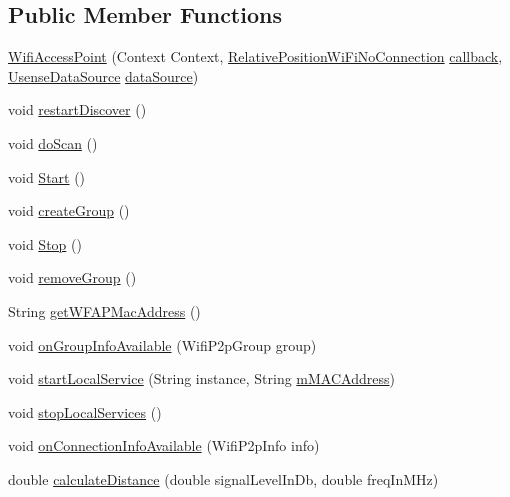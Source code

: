 \subsection*{Public Member Functions}
\begin{DoxyCompactItemize}
\item 
\hyperlink{classcs_1_1usense_1_1location_1_1_wifi_access_point_aa3fc382e38fa0c62693dddefd3700edf}{Wifi\+Access\+Point} (Context Context, \hyperlink{classcs_1_1usense_1_1location_1_1_relative_position_wi_fi_no_connection}{Relative\+Position\+Wi\+Fi\+No\+Connection} \hyperlink{classcs_1_1usense_1_1location_1_1_wifi_access_point_a82f3956b7d04dc3094a2be54f0d4fde4}{callback}, \hyperlink{classcs_1_1usense_1_1db_1_1_usense_data_source}{Usense\+Data\+Source} \hyperlink{classcs_1_1usense_1_1location_1_1_wifi_access_point_a046e96970d77ff745ff03479896c6c74}{data\+Source})
\item 
void \hyperlink{classcs_1_1usense_1_1location_1_1_wifi_access_point_a73cc968d6eee74781820ff3ac7110f05}{restart\+Discover} ()
\item 
void \hyperlink{classcs_1_1usense_1_1location_1_1_wifi_access_point_a11473f8fc644e34541c4a235222c90a6}{do\+Scan} ()
\item 
void \hyperlink{classcs_1_1usense_1_1location_1_1_wifi_access_point_a77f7aa89f57bd30bf9c8a8f5a52523bb}{Start} ()
\item 
void \hyperlink{classcs_1_1usense_1_1location_1_1_wifi_access_point_a7afd9a125fb7bf6dbc21494896134bda}{create\+Group} ()
\item 
void \hyperlink{classcs_1_1usense_1_1location_1_1_wifi_access_point_a05db8939668e0ac3e0c8a106fda31c55}{Stop} ()
\item 
void \hyperlink{classcs_1_1usense_1_1location_1_1_wifi_access_point_a78c51a45a27a22375d51105a5baf1a60}{remove\+Group} ()
\item 
String \hyperlink{classcs_1_1usense_1_1location_1_1_wifi_access_point_aa64769c3ebaf9ec1481ee2123b180d7c}{get\+W\+F\+A\+P\+Mac\+Address} ()
\item 
void \hyperlink{classcs_1_1usense_1_1location_1_1_wifi_access_point_a57e5cc1c85b2b78c7d08e18357633fa7}{on\+Group\+Info\+Available} (Wifi\+P2p\+Group group)
\item 
void \hyperlink{classcs_1_1usense_1_1location_1_1_wifi_access_point_a9cb3a0d3e83355f8346c021bdf182d53}{start\+Local\+Service} (String instance, String \hyperlink{classcs_1_1usense_1_1location_1_1_wifi_access_point_a41728f8ebcdd2aceabf9cf94bb50e797}{m\+M\+A\+C\+Address})
\item 
void \hyperlink{classcs_1_1usense_1_1location_1_1_wifi_access_point_a49df2159322431dc978cca719e3700c1}{stop\+Local\+Services} ()
\item 
void \hyperlink{classcs_1_1usense_1_1location_1_1_wifi_access_point_a744abc5bb2d662513515d2ba9bfab49f}{on\+Connection\+Info\+Available} (Wifi\+P2p\+Info info)
\item 
double \hyperlink{classcs_1_1usense_1_1location_1_1_wifi_access_point_a1901216dc0db2d5d7dca020fd988cede}{calculate\+Distance} (double signal\+Level\+In\+Db, double freq\+In\+M\+Hz)
\end{DoxyCompactItemize}
